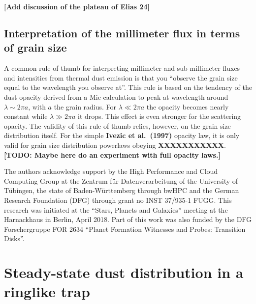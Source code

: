 \documentclass{aa}
\begin{document}
{\bf [Add discussion of the plateau of Elias 24]}

\subsection{Interpretation of the millimeter flux in terms of grain size}
A common rule of thumb for interpreting millimeter and sub-millimeter
fluxes and intensities from thermal dust emission is that you ``observe
the grain size equal to the wavelength you observe at''. This rule is
based on the tendency of the dust opacity derived from a Mie calculation
to peak at wavelength around $\lambda\sim 2\pi a$, with $a$ the grain
radius. For $\lambda \ll 2\pi a$ the opacity becomes nearly constant
while $\lambda \gg 2\pi a$ it drops. This effect is even stronger for
the scattering opacity. The validity of this rule of thumb relies,
however, on the grain size distribution itself. For the simple
{\bf Ivezic et al.~(1997)} opacity law, it is only valid for
grain size distribution powerlaws obeying {\bf XXXXXXXXXXX}.
{\bf [TODO: Maybe here do an experiment with full opacity laws.]}




\begin{acknowledgements}
  The authors acknowledge support
  by the High Performance and Cloud Computing Group at the Zentrum f\"ur
  Datenverarbeitung of the University of T\"ubingen, the state of
  Baden-W\"urttemberg through bwHPC and the German Research Foundation (DFG)
  through grant no INST 37/935-1 FUGG. This research was initiated at the
  ``Stars, Planets and Galaxies'' meeting at the Harnackhaus in Berlin,
  April 2018. Part of this work was also funded by the DFG Forschergruppe
  FOR 2634 ``Planet Formation Witnesses and Probes: Transition Disks''.
\end{acknowledgements}


\begingroup


\endgroup

\appendix

\section{Steady-state dust distribution in a ringlike trap}
\label{sec-steady-state-analytic-trap-model}
%
\end{document}
